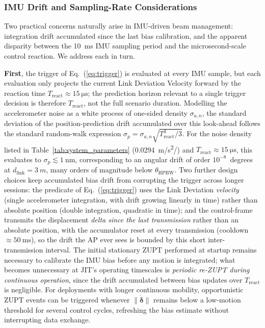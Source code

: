 \documentclass[fleqn,10pt]{wlscirep}
\newcommand{\rev}[1]{{\color{revblue}#1}}
\begin{document}
\rev{\subsubsection*{IMU Drift and Sampling-Rate Considerations}
Two practical concerns naturally arise in IMU-driven beam management: integration drift accumulated since the last bias calibration, and the apparent disparity between the \SI{10}{\milli\second} IMU sampling period and the microsecond-scale control reaction. We address each in turn.

\textbf{First}, the trigger of Eq.~(\ref{eq:trigger}) is evaluated at every IMU sample, but each evaluation only projects the current Link Deviation Velocity forward by the reaction time $T_{\text{react}} \approx \SI{15}{\micro\second}$; the prediction horizon relevant to a single trigger decision is therefore $T_{\text{react}}$, not the full scenario duration. Modelling the accelerometer noise as a white process of one-sided density $\sigma_{a,n}$, the standard deviation of the position-prediction drift accumulated over this look-ahead follows the standard random-walk expression $\sigma_{p} = \sigma_{a,n}\sqrt{T_{\text{react}}^{3}/3}$. For the noise density listed in Table~\ref{tab:system_parameters} (\SI{0.0294}{m/s^2/\sqrt{\hertz}}) and $T_{\text{react}} \approx \SI{15}{\micro\second}$, this evaluates to $\sigma_{p} \lesssim \SI{1}{\nano\meter}$, corresponding to an angular drift of order $10^{-8}$~degrees at $d_{\text{link}} = \SI{3}{m}$, many orders of magnitude below $\theta_{\text{HPBW}}$. Two further design choices keep accumulated bias drift from corrupting the trigger across longer sessions: the predicate of Eq.~(\ref{eq:trigger}) uses the Link Deviation \emph{velocity} (single accelerometer integration, with drift growing linearly in time) rather than absolute position (double integration, quadratic in time); and the control-frame transmits the displacement \emph{delta since the last transmission} rather than an absolute position, with the accumulator reset at every transmission (cooldown $\approx \SI{50}{\milli\second}$), so the drift the AP ever sees is bounded by this short inter-transmission interval. The initial stationary ZUPT performed at startup remains necessary to calibrate the IMU bias before any motion is integrated; what becomes unnecessary at JIT's operating timescales is \emph{periodic re-ZUPT during continuous operation}, since the drift accumulated between bias updates over $T_{\text{react}}$ is negligible. For deployments with longer continuous mobility, opportunistic ZUPT events can be triggered whenever $\|\dot{\boldsymbol{\delta}}\|$ remains below a low-motion threshold for several control cycles, refreshing the bias estimate without interrupting data exchange.

}
\end{document}
